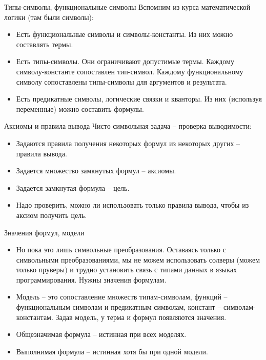 \documentclass[hyperref={unicode=true}]{beamer}
\begin{document}
    \begin{frame}{Типы-символы, функциональные символы}
    Вспомним из курса математической логики (там были символы):
    \begin{itemize}
    \item
    Есть функциональные символы и символы-константы.
    Из них можно составлять термы.
    \item
    Есть типы-символы. Они ограничивают допустимые термы.
    Каждому символу-константе сопоставлен тип-символ.
    Каждому функциональному символу сопоставлены типы-символы
    для аргументов и результата.
    \item
    Есть предикатные символы, логические связки и кванторы.
    Из них (используя переменные) можно составить формулы.
    \end{itemize}
    \end{frame}

    \begin{frame}{Аксиомы и правила вывода}
    Чисто символьная задача -- проверка выводимости:
    \begin{itemize}
    \item
    Задаются правила получения некоторых формул из некоторых других
    -- правила вывода.
    \item
    Задается множество замкнутых формул -- аксиомы.
    \item
    Задается замкнутая формула -- цель.
    \item
    Надо проверить, можно ли использовать только правила вывода,
    чтобы из аксиом получить цель.
    \end{itemize}
    \end{frame}

    \begin{frame}{Значения формул, модели}
    \begin{itemize}
    \item
    Но пока это лишь символьные преобразования. Оставаясь
    только с символьными преобразованиями, мы не можем
    использовать солверы (можем только пруверы) и трудно
    установить связь с типами данных в языках программирования.
    Нужны значения формулам.
    \item
    Модель -- это сопоставление множеств типам-символам,
    функций -- функциональным символам и предикатным символам,
    констант -- символам-константам. Задав модель, у терма
    и формул появляются значения.
    \item
    Общезначимая формула -- истинная при всех моделях.
    \item
    Выполнимая формула -- истинная хотя бы при одной модели.
    \end{itemize}
    \end{frame}
\end{document}
